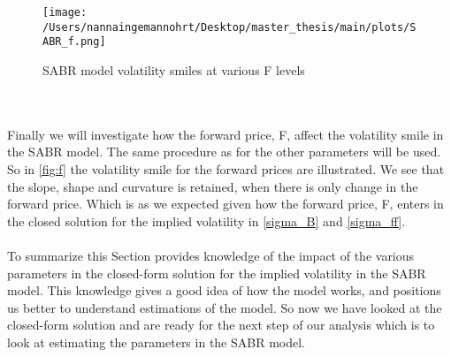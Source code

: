 \begin{figure}[H]
    \centering
    \texttt{[image: /Users/nannaingemannohrt/Desktop/master\_thesis/main/plots/SABR\_f.png]}
    \caption{SABR model volatility smiles at various F levels}
    \label{fig:f}
\end{figure}
\noindent
\\\\
Finally we will investigate how the forward price, F, affect the volatility smile in the SABR model. 
The same procedure as for the other parameters will be used. So in \autoref{fig:f} the volatility smile
for the forward prices are illustrated. We see that the slope, shape and curvature is retained, when there
is only change in the forward price. Which is as we expected given how the forward price, F, enters in the closed
solution for the implied volatility in \autoref{sigma_B} and \autoref{sigma_ff}.
\\\\
To summarize this Section provides knowledge of the impact of the various parameters in the closed-form solution
for the implied volatility in the SABR model. This knowledge gives a good idea of how the model works, and 
positions us better to understand estimations of the model. So now we have looked at the closed-form solution and 
are ready for the next step of our analysis which is to look at  estimating the parameters in the SABR model.
\newpage
